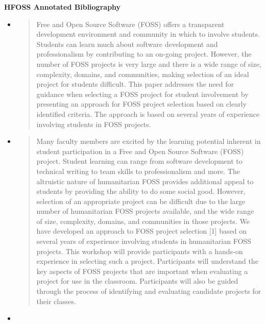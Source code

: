 \documentclass[11pt]{article}
\begin{document}
\centerline{\large\bf HFOSS Annotated Bibliography}

\vspace{.25in}



\begin{itemize}
\item \cite{Ellis:2012}

\begin{quote}
Free and Open Source Software (FOSS) offers a transparent development environment and community in which to involve students. Students can learn much about software development and professionalism by contributing to an on-going project. However, the number of FOSS projects is very large and there is a wide range of size, complexity, domains, and communities, making selection of an ideal project for students difficult. This paper addresses the need for guidance when selecting a FOSS project for student involvement by presenting an approach for FOSS project selection based on clearly identified criteria. The approach is based on several years of experience involving students in FOSS projects.
\end{quote}

\item \cite{Ellis:2013}

\begin{quote}
Many faculty members are excited by the learning potential inherent in student participation in a Free and Open Source Software (FOSS) project. Student learning can range from software development to technical writing to team skills to professionalism and more. The altruistic nature of humanitarian FOSS provides additional appeal to students by providing the ability to do some social good. However, selection of an appropriate project can be difficult due to the large number of humanitarian FOSS projects available, and the wide range of size, complexity, domains, and communities in those projects. We have developed an approach to FOSS project selection [1] based on several years of experience involving students in humanitarian FOSS projects. This workshop will provide participants with a hands-on experience in selecting such a project. Participants will understand the key aspects of FOSS projects that are important when evaluating a project for use in the classroom. Participants will also be guided through the process of identifying and evaluating candidate projects for their classes.
\end{quote}

\item \cite{Ellis:2014}


\end{itemize}
\end{document}
